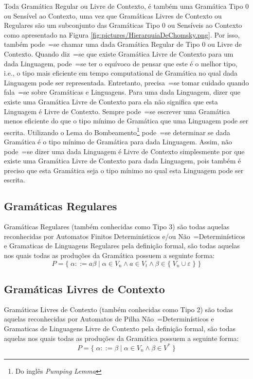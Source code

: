 {    Toda Gramática Regular ou Livre de Contexto,
    é também uma Gramática Tipo 0 ou Sensível ao Contexto,
    uma vez que Gramáticas Livres de Contexto ou Regulares são um
    subconjunto das Gramáticas Tipo 0 ou Sensíveis ao Contexto como
    apresentado na Figura \ref{fig:pictures/HierarquiaDeChomsky.png}.
    Por isso,
    também pode~=se chamar uma dada Gramática Regular de Tipo 0 ou Livre de Contexto.
    Quando diz~=se que existe Gramática Livre de Contexto para um dada Linguagem,
    pode~=se ter o equívoco de pensar que este é o melhor tipo,
    i.e.,
    o tipo mais eficiente em tempo computational de Gramática
    no qual dada Linguagem pode ser representada.
    Entretanto,
    precisa~=se tomar cuidado quando fala~=se sobre Gramáticas e
    Linguagens.
    Para uma dada Linguagem,
    dizer que existe uma Gramática Livre de Contexto para ela
    não significa que esta Linguagem é Livre de Contexto.
    Sempre pode~=se escrever uma Gramática menos eficiente do que o
    tipo mínimo de Gramática que uma Linguagem pode ser escrita.
    Utilizando o Lema do Bombeamento\footnote{Do inglês \textit{Pumping Lemma}} \cite{hopcroftBook}
    pode~=se determinar se dada Gramática é o tipo mínimo de Gramática para dada Linguagem.
    Assim,
    não pode~=se dizer uma dada Linguagem é Livre de Contexto simplesmente
    por que existe uma Gramática Livre de Contexto para dada Linguagem,
    pois também é preciso que esta Gramática seja o tipo
    mínimo no qual esta Linguagem pode ser escrita.


\subsection*{Gramáticas Regulares}

    Gramáticas Regulares (também conhecidas como Tipo 3) são todas aquelas reconhecidas
    por Automatos Finitos Determinísticos e\slash{}ou Não~=Determinísticos e
    Gramaticas de Linguagens Regulares pela definição formal,
    são todas aquelas nos quais todas as produções da Gramática possuem a seguinte forma:
    $$ P = \{\; \alpha ::= a \beta \;|\; \alpha \in V_n \land a \in V_t
                \land \beta \in \{\; V_n \cup \varepsilon\; \} \;\} $$

\subsection*{Gramáticas Livres de Contexto}

    Gramáticas Livres de Contexto (também conhecidas como Tipo 2) são todas
    aquelas reconhecidas por Automatos de Pilha Não~=Determinísticos e
    Gramaticas de Linguagens Livre de Contexto pela definição formal,
    são todas aquelas nos quais todas as produções da Gramática possuem a seguinte forma:
    $$ P = \{\; \alpha ::= \beta \;|\; \alpha \in V_n \land \beta \in V^* \;\} $$


}
